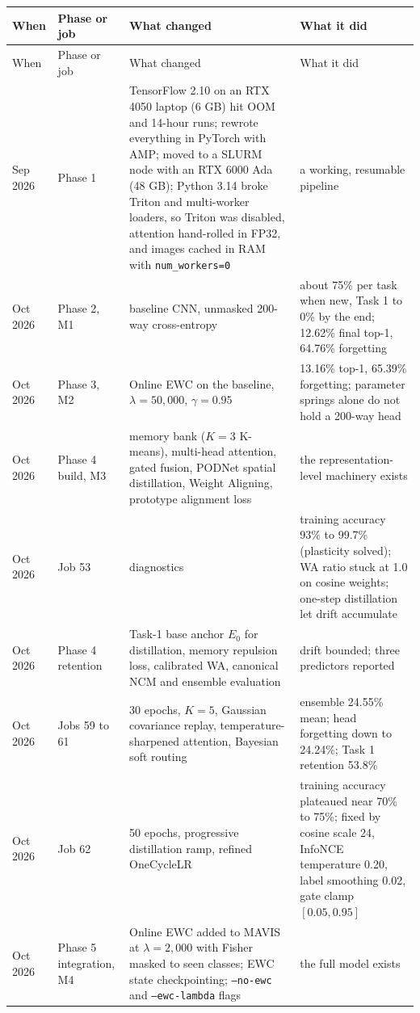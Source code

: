 \documentclass[11pt,a4paper]{article}
\newcommand{\code}[1]{\texttt{#1}}
\begin{document}
\begin{longtable}{L{1.5cm} L{2.2cm} L{6.2cm} L{5.1cm}}
\toprule
When & Phase or job & What changed & What it did \\
\midrule
\endfirsthead
\toprule
When & Phase or job & What changed & What it did \\
\midrule
\endhead
\bottomrule
\endfoot
Sep 2026 & Phase 1 & TensorFlow 2.10 on an RTX 4050 laptop (6 GB) hit OOM and 14-hour runs; rewrote everything in PyTorch with AMP; moved to a SLURM node with an RTX 6000 Ada (48 GB); Python 3.14 broke Triton and multi-worker loaders, so Triton was disabled, attention hand-rolled in FP32, and images cached in RAM with \code{num\_workers=0} & a working, resumable pipeline \\
Oct 2026 & Phase 2, M1 & baseline CNN, unmasked 200-way cross-entropy & about 75\% per task when new, Task 1 to 0\% by the end; 12.62\% final top-1, 64.76\% forgetting \\
Oct 2026 & Phase 3, M2 & Online EWC on the baseline, $\lambda = 50{,}000$, $\gamma = 0.95$ & 13.16\% top-1, 65.39\% forgetting; parameter springs alone do not hold a 200-way head \\
Oct 2026 & Phase 4 build, M3 & memory bank ($K{=}3$ K-means), multi-head attention, gated fusion, PODNet spatial distillation, Weight Aligning, prototype alignment loss & the representation-level machinery exists \\
Oct 2026 & Job 53 & diagnostics & training accuracy 93\% to 99.7\% (plasticity solved); WA ratio stuck at 1.0 on cosine weights; one-step distillation let drift accumulate \\
Oct 2026 & Phase 4 retention & Task-1 base anchor $E_0$ for distillation, memory repulsion loss, calibrated WA, canonical NCM and ensemble evaluation & drift bounded; three predictors reported \\
Oct 2026 & Jobs 59 to 61 & 30 epochs, $K{=}5$, Gaussian covariance replay, temperature-sharpened attention, Bayesian soft routing & ensemble 24.55\% mean; head forgetting down to 24.24\%; Task 1 retention 53.8\% \\
Oct 2026 & Job 62 & 50 epochs, progressive distillation ramp, refined OneCycleLR & training accuracy plateaued near 70\% to 75\%; fixed by cosine scale 24, InfoNCE temperature 0.20, label smoothing 0.02, gate clamp $[0.05, 0.95]$ \\
Oct 2026 & Phase 5 integration, M4 & Online EWC added to MAVIS at $\lambda = 2{,}000$ with Fisher masked to seen classes; EWC state checkpointing; \code{--no-ewc} and \code{--ewc-lambda} flags & the full model exists \\

\end{longtable}
\end{document}
